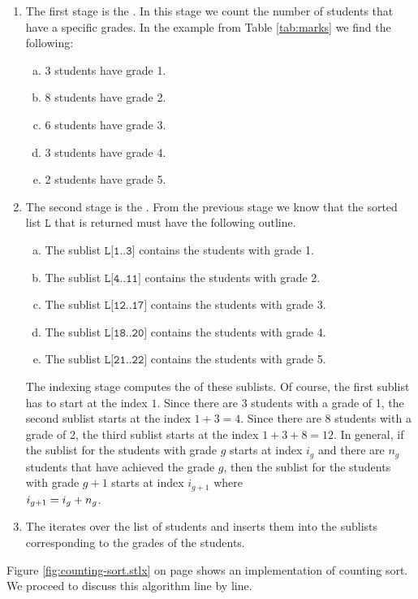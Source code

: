 \begin{enumerate}
\item The first stage is the .  In this stage we count the number of students
      that have a specific grades.  In the example from Table \ref{tab:marks} we find the following:
      \begin{enumerate}[(a)]
      \item 3 students have grade 1.
      \item 8 students have grade 2.
      \item 6 students have grade 3.
      \item 3 students have grade 4.
      \item 2 students have grade 5.
      \end{enumerate}
\item The second stage is the .   From the previous stage we know that the sorted
      list $\texttt{L}$ that is returned must have the following outline.
      \begin{enumerate}[(a)]
      \item The sublist $\texttt{L[1..3]}$ contains the students with grade 1.
      \item The sublist $\texttt{L[4..11]}$ contains the students with grade 2.
      \item The sublist $\texttt{L[12..17]}$ contains the students with grade 3.
      \item The sublist $\texttt{L[18..20]}$ contains the students with grade 4.
      \item The sublist $\texttt{L[21..22]}$ contains the students with grade 5.
      \end{enumerate}
      The indexing stage computes the  of these sublists.
      Of course,  the first sublist has to start at the index $1$.  Since there are 3 students with a grade of 1,
      the second sublist starts at the index $1 + 3 = 4$.  Since there are 8 students with a grade of 2, the third
      sublist starts at the index $1 + 3 + 8 = 12$.  In general, if the sublist for the students with grade $g$
      starts at index $i_g$ and there are $n_g$ students that have achieved the grade $g$, then the sublist for the
      students with grade $g+1$ starts at index $i_{g+1}$ where
      \\[0.2cm]
      \hspace*{1.3cm}
      $\displaystyle i_{g+1} = i_g + n_g$.
\item The  iterates over the list of students and inserts them into the sublists
      corresponding to the grades of the students.
\end{enumerate}
Figure \ref{fig:counting-sort.stlx} on page \pageref{fig:counting-sort.stlx} shows an implementation of
counting sort.  We proceed to discuss this algorithm line by line.

